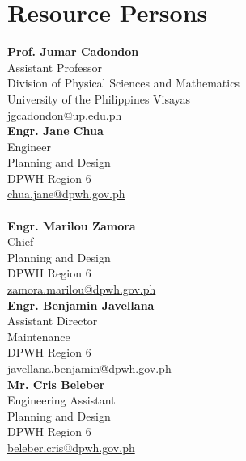 %
%
%                 

\chapter{Resource Persons}
\label{sec:appendixb}

\newcommand{\resperson}[5]{%
	\textbf{#1} \\ %
	#2 \\          %
	#3 \\          %
	#4 \\          %
	\url{#5}       %
	\vspace{0.5em} \\
}

\resperson{Prof. Jumar Cadondon}{Assistant Professor}{Division of Physical Sciences and Mathematics}{University of the Philippines Visayas}{jgcadondon@up.edu.ph}

\resperson{Engr. Jane Chua}{Engineer}{Planning and Design}{DPWH Region 6}{chua.jane@dpwh.gov.ph}\\

\resperson{Engr. Marilou Zamora}{Chief}{Planning and Design}{DPWH Region 6}{zamora.marilou@dpwh.gov.ph}

\resperson{Engr. Benjamin Javellana}{Assistant Director}{Maintenance}{DPWH Region 6}{javellana.benjamin@dpwh.gov.ph}

\resperson{Mr. Cris Beleber}{Engineering Assistant}{Planning and Design}{DPWH Region 6}{beleber.cris@dpwh.gov.ph}